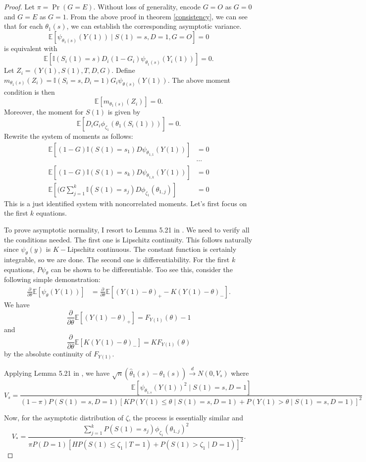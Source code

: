 \documentclass[12pt]{article}
\newcommand{\Indc}{\mathbb{I}}
\newcommand{\Ep}{\mathbb{E}}
\begin{document}
	\begin{proof}
		Let $\pi = \Pr(G = E).$ Without loss of generality, encode $G = O$ as $G = 0$ and $G = E$ as $G = 1$. From the above proof in theorem \ref{consistency}, we can see that for each $\theta_1(s)$, we can establish the corresponding asymptotic variance.
		$$\Ep[\psi_{\theta_1(s)}(Y(1)) \mid S(1) = s, D = 1, G = O] = 0$$ is equivalent with 
		$$\Ep[\Indc(S_i(1) = s) D_i(1-G_i)\psi_{\theta_1(s)}(Y_i(1))] = 0.$$
		Let $Z_i = (Y(1), S(1), T, D, G)$. Define $m_{\theta_1(s)}(Z_i) = \Indc(S_i = s, D_i=1) G_i \psi_{\theta(s)}(Y(1)).$ The above moment condition is then $$\Ep[m_{\theta_1(s)}(Z_i)] = 0.$$ 
		Moreover, the moment for $S(1)$ is given by 
		$$\mathbb{E}\left[ D_i G_i \phi_{\zeta_1}(\theta_1(S_i(1)))\right] = 0.$$
		Rewrite the system of moments as follows:
		\begin{align*}
		\Ep[(1-G)\Indc(S(1) = s_1) D \psi_{\theta_{1,1}}(Y(1))] & = 0\\
		& \cdots \\
		\Ep[(1-G)\Indc(S(1) = s_k) D \psi_{\theta_{1,k}}(Y(1))] & = 0\\
		\Ep[(G \sum_{j =1}^k \Indc(S(1) = s_j) D \phi_{\zeta_1}(\theta_{1,j})] & = 0
		\end{align*}
		This is a just identified system with noncorrelated moments.
		Let's first focus on the first $k$ equations.
		
		To prove asymptotic normality, I resort to Lemma 5.21 in \textcite{van2000asymptotic}. We need to verify all the conditions needed. The first one is Lipschitz continuity. This follows naturally since $\psi_{\theta}(y)$ is $K-$Lipschitz continuous. The constant function is certainly integrable, so we are done. The second one is differentiability. For the first $k$ equations, $P\psi_{\theta}$ can be shown to be differentiable. Too see this, consider the following simple demonstration: 
		\begin{align*}
		\frac{\partial}{\partial \theta}\Ep[\psi_{\theta}(Y(1))] & = \frac{\partial}{\partial \theta} \Ep[(Y(1) - \theta)_+ - K (Y(1) - \theta)_-].
		\end{align*}
		We have
		$$\frac{\partial}{\partial \theta} \Ep[(Y(1) - \theta)_+] = F_{Y(1)}(\theta) - 1$$
		and 
		$$\frac{\partial}{\partial \theta} \Ep[K(Y(1) - \theta)_-] = K F_{Y(1)}(\theta) $$
		by the absolute continuity of $F_{Y(1)}$.
		
		Applying Lemma 5.21 in \textcite{van2000asymptotic}, we have $\sqrt{n} (\hat{\theta}_1(s) - \theta_1(s)) \overset{d}{\to} N(0, V_s)$ where 
		$$V_s = \frac{\Ep[\psi_{\theta_{1,s}}(Y(1))^2 \mid S(1) = s, D = 1]}{(1-\pi) P(S(1)=s, D=1) [K P(Y(1) \leq \theta \mid S(1) = s, D = 1) + P(Y(1) > \theta \mid S(1) = s, D = 1)]^2}$$
		
		Now, for the asymptotic distribution of $\zeta$, the process is essentially similar and $$V_* = \frac{\sum_{j=1}^k P(S(1) = s_j)\phi_{\zeta_1}(\theta_{1,j})^2}{\pi P(D = 1)[H P(S(1) \leq \zeta_1 \mid T = 1) + P(S(1)  > \zeta_1 \mid D = 1)]^2}.$$
	\end{proof}
	
\end{document}
